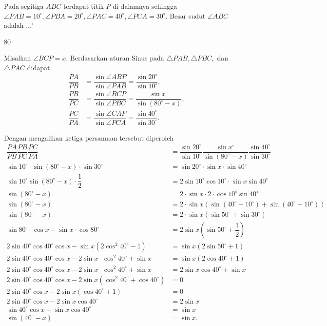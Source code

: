 \documentclass[12pt]{scrartcl}
\begin{document}
	\begin{soalbaru}
		Pada segitiga $ABC$ terdapat titik $P$ di dalamnya sehingga $\angle PAB = 10^\circ, \angle PBA = 20^\circ , \angle PAC = 40^\circ, \angle PCA = 30^\circ$. Besar sudut $\angle ABC$ adalah $\dots^\circ$ 
		
		\begin{jawaban}
				$80$
		\end{jawaban}
		\begin{solusi}
		Misalkan $\angle BCP = x$. Berdasarkan aturan Sinus pada $\triangle PAB, \triangle PBC,$ dan $\triangle PAC$ didapat
		\begin{align*}
		\dfrac{PA}{PB} &= \dfrac{\sin \angle ABP}{\sin \angle PAB} = \dfrac{\sin 20^\circ}{\sin 10^\circ}, \\
		\dfrac{PB}{PC} &= \dfrac{\sin \angle BCP}{\sin \angle PBC} = \dfrac{\sin x^\circ}{\sin (80
		^\circ-x)}, \\
		\dfrac{PC}{PA} &= \dfrac{\sin \angle CAP}{\sin \angle PCA} = \dfrac{\sin 40^\circ}{\sin 30^\circ}.
		\end{align*}
		
		Dengan mengalikan ketiga persamaan tersebut diperoleh
		\begin{align*}
		\dfrac{PA}{PB}\dfrac{PB}{PC}\dfrac{PC}{PA}&=\dfrac{\sin 20^\circ}{\sin 10^\circ}\dfrac{\sin x^\circ}{\sin (80^\circ-x)}\dfrac{\sin 40^\circ}{\sin 30^\circ}\\
		\sin 10^\circ \cdot \sin (80^\circ-x)\cdot \sin 30^\circ &= \sin 20^\circ\cdot \sin x \cdot \sin 40^\circ\\
		\sin 10^\circ \sin (80^\circ-x)\cdot \dfrac{1}{2}&=2\sin 10^\circ \cos 10^\circ\cdot \sin x \sin 40^\circ\\
		\sin (80^\circ-x)&=2\cdot\sin x \cdot 2\cdot \cos 10^\circ \sin 40^\circ\\
		\sin(80^\circ-x)&=2\cdot\sin x(\sin(40^\circ+10^\circ)+\sin(40^\circ-10^\circ))\\
		\sin(80^\circ-x)&=2\cdot\sin x(\sin50^\circ+\sin 30^\circ)\\
		\sin 80^\circ\cdot\cos x-\sin x\cdot \cos 80^\circ &= 2\sin x(\sin 50^\circ +\dfrac{1}{2})\\
		2\sin40^\circ\cos 40^\circ\cos x-\sin x(2\cos^2 40^\circ-1)&=\sin x(2\sin 50^\circ+1)\\
		2\sin40^\circ\cos 40^\circ\cos x-2\sin x\cdot\cos^2 40^\circ+\sin x &= \sin x (2 \cos 40^\circ+1)\\
		2\sin40^\circ\cos 40^\circ\cos x-2\sin x\cdot\cos^2 40^\circ+\sin x &= 2\sin x\cos 40^\circ + \sin x\\
		2\sin40^\circ\cos 40^\circ\cos x-2\sin x(\cos^2 40^\circ+\cos 40^\circ) &= 0\\
		2 \sin 40^\circ \cos x - 2\sin x(\cos 40^\circ+1)&=0\\
		2\sin 40^\circ\cos x-2\sin x\cos 40^\circ &= 2\sin x\\
		\sin 40^\circ\cos x-\sin x\cos 40^\circ &= \sin x\\
		\sin(40^\circ-x)&=\sin x. 
		\end{align*}
		

\end{solusi}
\end{soalbaru}
\end{document}
